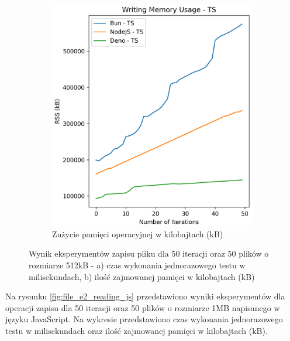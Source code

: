 \begin{figure}[H]
  \begin{subfigure}[b]{0.4\textwidth}
    \centering
    \includegraphics[width=\textwidth]{Figures/files/files_writing_50_500_50_ts_memory.png}
    \caption{Zużycie pamięci operacyjnej w kilobajtach (kB)}
    \label{fig:file_e1_writing_ts_memory}
  \end{subfigure}
  \caption{Wynik eksperymentów zapisu pliku dla 50 iteracji oraz 50 plików o rozmiarze 512kB - a) czas wykonania jednorazowego testu w milisekundach, b) ilość zajmowanej pamięci w kilobajtach (kB)}
  \label{fig:file_e1_writing_ts}
\end{figure}

Na rysunku \ref{fig:file_e2_reading_js} przedstawiono wyniki eksperymentów dla operacji zapisu dla 50 iteracji oraz 50 plików o rozmiarze 1MB napisanego w języku JavaScript. Na wykresie przedstawiono czas wykonania jednorazowego testu w milisekundach oraz ilość zajmowanej pamięci w kilobajtach (kB).

